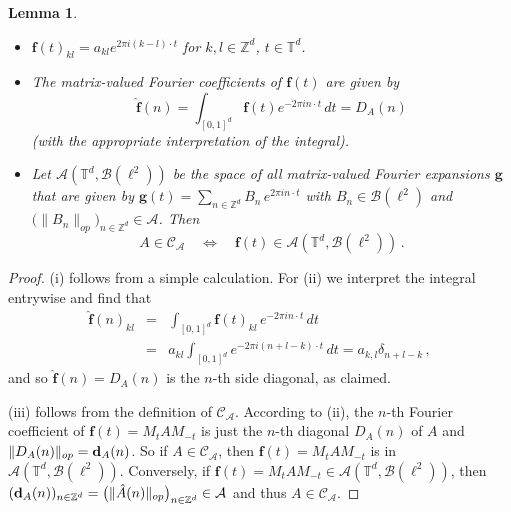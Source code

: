 \documentclass[12pt]{amsart}
\newtheorem{lemma}{Lemma}[section]
\theoremstyle{definition}
\theoremstyle{remark}
\numberwithin{equation}{section}
\def\cB{\mathcal{B}}
\def\cA{\mathcal{A}}
\def\bZ{{\mathbb{Z}}}
\def\bT{{\mathbb{T}}}
\def\cca{\Cal C_\ac}
\def\zd{\bZ^d}
\def\td{\bT^d}
\def\cB{\mathcal{B}}
\def\cA{\mathcal{A}}
\newcommand{\bbd}{{\bf d}}
\newcommand{\Cal}{\mathcal}
\newcommand{\ac}{\Cal A}
\begin{document}
\begin{lemma}\label{lem:vvfourier}
\begin{itemize}
\item[(i)] $\mathbf{f}(t) _{kl} = a_{kl} e^{2\pi i (k-l)\cdot t}$ for $k,l \in \zd
$, $t\in \td $.
\item[(ii)] The matrix-valued Fourier coefficients of $\mathbf{f}(t)$ are given by
\begin{equation}\label{eq:ma7}
\widehat{\mathbf{f}}(n) = \int _{[0,1]^d} \mathbf{f}(t) e^{-2\pi i n \cdot
t} \, dt
= D_A(n)
\end{equation}
(with the appropriate interpretation of the integral).
\item[(iii)] Let $ \cA (\td , \cB (\ell ^2) )$ be the space of all matrix-valued
Fourier expansions $\mathbf{g}$ that are given by $\mathbf{g}(t) =
\sum _{n\in \zd } B_n \, e^{2\pi i n\cdot t}$ with $B_n \in \cB
(\ell ^2)$ and $\big( \|B_n \|_{op} \big)_{n\in \zd } \in \cA $.
Then
\begin{equation}\label{eq:ma8}
A \in \cca \quad \Longleftrightarrow \quad \mathbf{f}(t) \in  \cA
(\td ,
\cB (\ell ^2) ) \, .
\end{equation}
\end{itemize}
\end{lemma}

\begin{proof}
(i) follows from a simple calculation. For (ii) we interpret the
integral entrywise and find that
\begin{eqnarray*}
\widehat{\mathbf{f}}(n) _{kl} &=& \int _{[0,1]^d} \mathbf{f}(t) _{kl}\,
e^{-2\pi i
n\cdot t}\, dt \\ &=& a_{kl} \int _{[0,1]^d}  e^{-2\pi i (n+l-k)
\cdot t} \, dt = a_{k,l} \delta _{n+l-k} \, ,
\end{eqnarray*}
and so $\widehat{\mathbf{f}}(n) = D_A (n)$ is the $n$-th side diagonal, as
claimed.

(iii) follows from the definition of $\cca $. According to (ii),
the $n$-th Fourier coefficient of $\mathbf{f}(t)  = M_tA M_{-t}$
is just the $n$-th diagonal $D_A(n)$ of $A$ and $\|D_A(n)\|_{op}=
\bbd_A(n)$. So if $A \in \cca $, then $\mathbf{f}(t) = M_tA
M_{-t}$ is in $\cA (\td , \cB (\ell ^2) )$. Conversely, if
$\mathbf{f}(t)  = M_tA M_{-t}\in \cA (\td , \cB (\ell ^2) )$, then
$(\bbd_A(n))_{n\in \zd } = \big( \|\hat{A}(n)\|_{op}\big)_{n\in
\zd } \in \cA $ and thus $A \in \cca $.
\end{proof}
\end{document}

